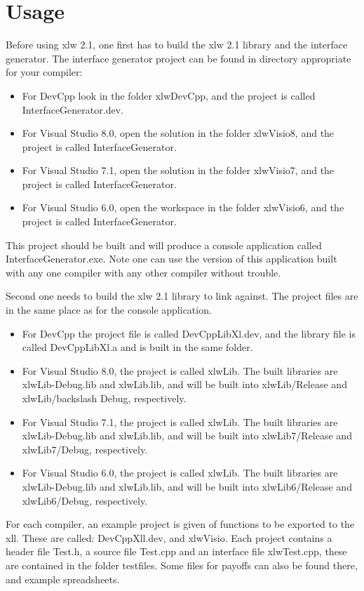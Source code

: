 \documentclass[12pt,reqno]{amsart}
\numberwithin{equation}{section}
\numberwithin{figure}{section}
\begin{document}
\section{Usage}

Before using xlw 2.1, one first has to build the xlw 2.1 library and
the interface generator. The interface generator project can be found
in directory appropriate for your compiler:
\begin{itemize}
\item For DevCpp look in the folder xlwDevCpp, and the project is
  called InterfaceGenerator.dev.
\item For Visual Studio 8.0, open the solution in the folder xlwVisio8, and the
  project is called InterfaceGenerator. 
\item For Visual Studio 7.1, open the solution in the folder xlwVisio7, and the
  project is called InterfaceGenerator. 
\item For Visual Studio 6.0, open the workspace in the folder
  xlwVisio6, and the project is called InterfaceGenerator. 
\end{itemize}
This project should be built and will produce a console application
called InterfaceGenerator.exe. Note one can use the version of this
application built with any one compiler with any other compiler
without trouble. 

Second one needs to build the xlw 2.1 library to link against. The
project files are in the same place as for the console application. 
\begin{itemize}
\item For DevCpp the project file is called DevCppLibXl.dev, 
and the
  library file is called  DevCppLibXl.a and is built in the same
  folder. 
\item For Visual Studio 8.0, the project is called xlwLib. The built
  libraries are xlwLib-Debug.lib and xlwLib.lib, and will be built
  into xlwLib/Release and  xlwLib/backslash Debug, respectively. 
\item For Visual Studio 7.1, the project is called xlwLib. The built
  libraries are xlwLib-Debug.lib and xlwLib.lib, and will be built
  into xlwLib7/Release and  xlwLib7/Debug, respectively. 
\item For Visual Studio 6.0, the project is called xlwLib. The built
  libraries are xlwLib-Debug.lib and xlwLib.lib, and will be built
  into xlwLib6/Release and  xlwLib6/Debug, respectively. 
\end{itemize}

For each compiler, an example project is given of functions to be
exported to the xll. These are called: DevCppXll.dev, and xlwVisio.
Each project contains a header file Test.h, a source file
Test.cpp and an interface file xlwTest.cpp, these are contained in the
folder testfiles. Some files for payoffs can also be found there, and
example spreadsheets. 
\end{document}
